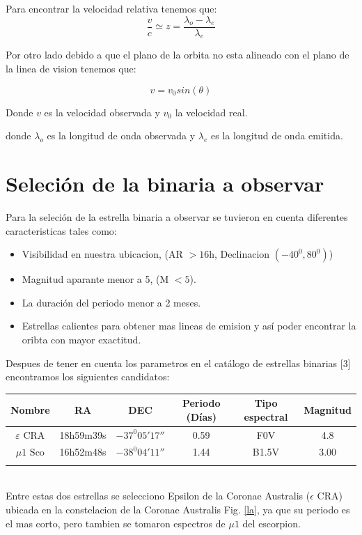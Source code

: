 \documentclass[Proceedings]{ascelike}
\begin{document}
Para encontrar la velocidad relativa tenemos que:
\begin{equation}
\dfrac{v}{c} \simeq z = \dfrac{\lambda_{o} - \lambda_{e}}{ \lambda_{e}}
\end{equation} 

Por otro lado debido a que el plano de la orbita no esta alineado con el plano de la linea de vision 
tenemos que:

\begin{equation}
v = v_0 sin(\theta)
\end{equation}

Donde $v$ es la velocidad observada y $v_0$ la velocidad real.

donde $\lambda_{o}$ es la longitud de onda observada y $\lambda_{e}$ es la longitud de onda
emitida.

\section{Seleci\'on de la binaria a observar}

Para la seleci\'on de la estrella binaria a observar se tuvieron en cuenta 
diferentes caracteristicas tales como:

\begin{itemize}
\item Visibilidad en nuestra ubicacion, (AR $> 16$h, Declinacion $(-40^{0}, 80^{0})$)
\item Magnitud aparante menor a 5, (M $<5$).
\item La duraci\'on del periodo menor a 2 meses.
\item Estrellas calientes para obtener mas lineas de emision y as\'i poder
encontrar la oribta con mayor exactitud.
\end{itemize}

Despues de tener en cuenta los parametros en el cat\'alogo de estrellas binarias [3] encontramos los siguientes candidatos:\\

\begin{tabular}{c c c c c c}
\hline
Nombre & RA & DEC & Periodo (D\'ias) & Tipo espectral & Magnitud\\
\hline
$\varepsilon$ $\mathrm{CRA}$ & 18h59m39s & $-37^{0}05' 17''$ & 0.59 & F0V & 4.8\\
\hline
$\mu 1$ $\mathrm{Sco}$ & 16h52m48s & $-38^{0}04'11''$& 1.44 & B1.5V& 3.00\\
\hline
\\
\end{tabular}
\\
Entre estas dos estrellas se selecciono Epsilon de la Coronae Australis (${\epsilon}$ CRA) ubicada en la 
constelacion de la Coronae Australis Fig. \ref{la}, ya que su periodo es el mas corto, pero tambien se tomaron 
espectros de $\mu 1$ del escorpion. 
\end{document}
